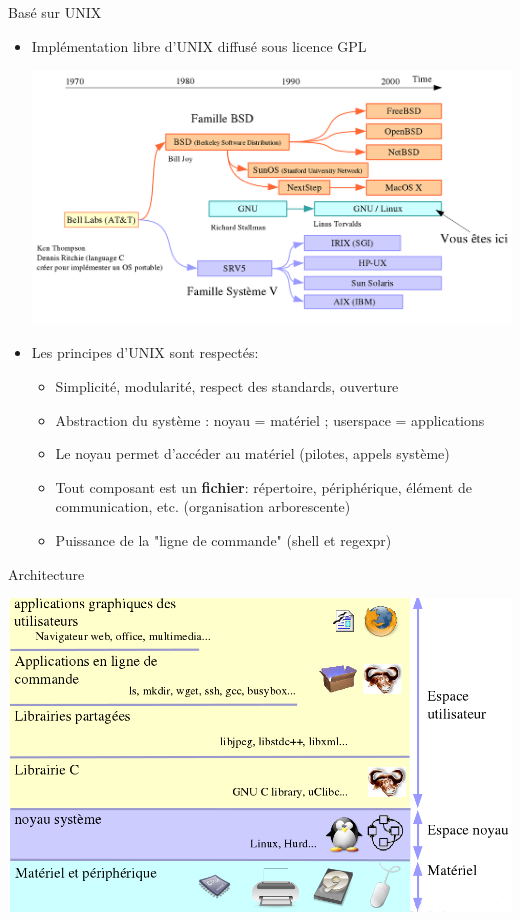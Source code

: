\begin{frame}{Basé sur UNIX}{}
  \begin{itemize}
  \item Implémentation libre d'UNIX diffusé sous licence GPL
  \begin{center}
    \includegraphics[height=0.4\textheight]{pictures/01_cours_magistral/unix.png}
  \end{center}
  \item Les principes d'UNIX sont respectés:
  \begin{itemize}
  \item Simplicité, modularité, respect des standards, ouverture
  \item Abstraction du système : noyau = matériel ; userspace = applications
  \item Le noyau permet d'accéder au matériel (pilotes, appels système)
  \item Tout composant est un \textbf{fichier}: répertoire, périphérique, élément de communication, etc. (organisation arborescente)
  \item Puissance de la "ligne de commande" (shell et regexpr)
  \end{itemize}
  \end{itemize}
\end{frame}

\begin{frame}{Architecture}{}
  \begin{center}
    \includegraphics[height=0.8\textheight]{pictures/01_cours_magistral/architecture-unix.png}
  \end{center}
\end{frame}

